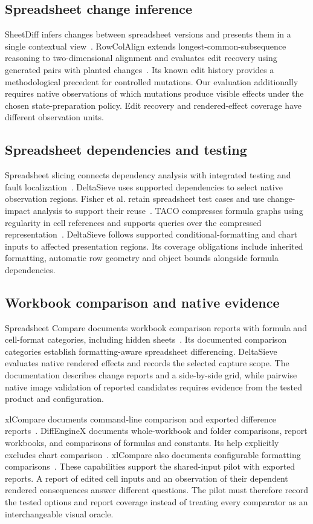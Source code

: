 \subsection{Spreadsheet change inference}
SheetDiff infers changes between spreadsheet versions and presents them in a
single contextual view~\cite{sheetdiff}. RowColAlign extends longest-common-subsequence reasoning
to two-dimensional alignment and evaluates edit recovery using generated pairs
with planted changes~\cite{rowcolalign}. Its known edit history provides a
methodological precedent for controlled mutations. Our evaluation additionally
requires native observations of which mutations produce visible effects under
the chosen state-preparation policy. Edit recovery and rendered-effect coverage
have different observation units.

\subsection{Spreadsheet dependencies and testing}
Spreadsheet slicing connects dependency analysis with integrated testing and
fault localization~\cite{slicing}. DeltaSieve uses supported dependencies to
select native observation regions. Fisher et al. retain spreadsheet test cases
and use change-impact analysis to support their reuse~\cite{fisher2002testreuse}.
TACO compresses formula graphs using regularity in cell references and supports
queries over the compressed representation~\cite{tang2023taco}.
DeltaSieve follows supported conditional-formatting and chart inputs to affected
presentation regions. Its coverage obligations include inherited formatting,
automatic row geometry and object bounds alongside formula dependencies.

\subsection{Workbook comparison and native evidence}
Spreadsheet Compare documents workbook comparison reports with formula and
cell-format categories, including hidden sheets~\cite{spreadsheetcompare}.
Its documented comparison categories establish formatting-aware spreadsheet
differencing. DeltaSieve evaluates native rendered effects and records the
selected capture scope. The documentation describes change reports and a
side-by-side grid, while pairwise native image validation of reported candidates
requires evidence from the tested product and configuration.

xlCompare documents command-line comparison and exported difference reports~\cite{xlcompare}.
DiffEngineX documents whole-workbook and folder comparisons, report workbooks,
and comparisons of formulas and constants. Its help explicitly excludes chart
comparison~\cite{diffenginex}. xlCompare also documents configurable formatting comparisons~\cite{xlcompareHelp}.
These capabilities support the shared-input pilot with exported reports. A report of edited cell inputs and an
observation of their dependent rendered consequences answer different questions.
The pilot must therefore record the tested options and report coverage instead
of treating every comparator as an interchangeable visual oracle.

